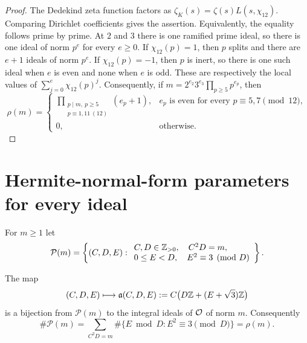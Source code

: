 \begin{proof}
The Dedekind zeta function factors as
$\zeta_K(s)=\zeta(s)L(s,\chi_{12})$.  Comparing Dirichlet coefficients
gives the assertion.  Equivalently, the equality follows prime by prime.
At $2$ and $3$ there is one ramified prime ideal, so there is one ideal of
norm $p^e$ for every $e\geq0$.  If $\chi_{12}(p)=1$, then $p$ splits and
there are $e+1$ ideals of norm $p^e$.  If $\chi_{12}(p)=-1$, then $p$ is
inert, so there is one such ideal when $e$ is even and none when $e$ is
odd.  These are respectively the local values of
$\sum_{j=0}^e\chi_{12}(p)^j$.
Consequently, if
$m=2^{e_2}3^{e_3}\prod_{p\geq5}p^{e_p}$, then
\begin{equation}
 \rho(m)=
 \begin{cases}
  \displaystyle\prod_{\substack{p\mid m,\ p\geq5\\p\equiv1,11\ (12)}}(e_p+1),
   &e_p\text{ is even for every }p\equiv5,7\pmod {12},\\[6pt]
  0,&\text{otherwise}.
 \end{cases}
 \label{koide-param-eq:rho-Euler-product}
\end{equation}
\end{proof}

\section{Hermite-normal-form parameters for every ideal}

For $m\geq1$ let
\begin{equation}
 \mathcal P(m)=
 \left\{(C,D,E):
 \begin{array}{l}
 C,D\in\mathbb Z_{>0},\quad C^2D=m,\\
 0\leq E<D,\quad E^2\equiv3\pmod D
 \end{array}
 \right\}.
 \label{koide-param-eq:P-m}
\end{equation}

\begin{proposition}
\label{koide-param-prop:HNF-ideals}
The map
\begin{equation}
 (C,D,E)\longmapsto
 \mathfrak a(C,D,E)
 :=C\bigl(D\mathbb Z+(E+\sqrt3)\mathbb Z\bigr)
 \label{koide-param-eq:param-ideal}
\end{equation}
is a bijection from $\mathcal P(m)$ to the integral ideals of $\mathcal O$ of
norm $m$.  Consequently
\begin{equation}
 \#\mathcal P(m)
 =\sum_{C^2D=m}\#\{E\bmod D:E^2\equiv3\pmod D\}
 =\rho(m).
 \label{koide-param-eq:root-divisor-identity}
\end{equation}
\end{proposition}

